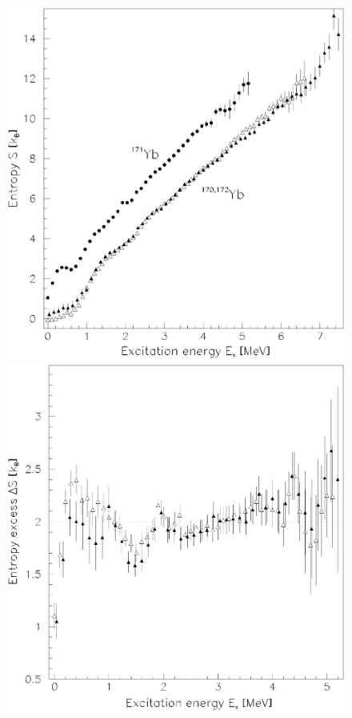 \documentclass[sort&compress,final,numberedheadings]{aipproc}
\begin{document}
\begin{figure}
\includegraphics[totalheight=5cm,angle=0,bb=45 151 527 651,clip]{fig3a.ps}
\hspace*{0.5cm}
\includegraphics[totalheight=5cm,angle=0,bb=35 148 527 651,clip]{fig3b.ps}

\end{figure}
\end{document}
